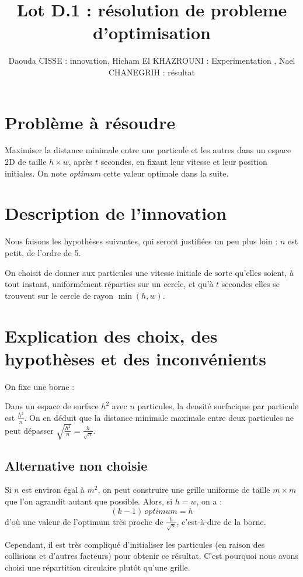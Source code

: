 \documentclass{article}
\begin{document}
\title{Lot D.1 : résolution de probleme d'optimisation}
\author{Daouda CISSE : innovation,
Hicham El KHAZROUNI : Experimentation ,
Nael CHANEGRIH : résultat}
\date{}
\maketitle

\section*{Problème à résoudre}
Maximiser la distance minimale entre une particule et les autres dans un espace 2D
de taille $h \times w$, après $t$ secondes, en fixant leur vitesse et leur position initiales.
On note \textit{optimum} cette valeur optimale dans la suite.

\section*{Description de l'innovation}
Nous faisons les hypothèses suivantes, qui seront justifiées un peu plus loin :
$n$ est petit, de l’ordre de 5.

On choisit de donner aux particules une vitesse initiale de sorte
qu’elles soient, à tout instant, uniformément réparties sur un cercle, et qu’à
$t$ secondes elles se trouvent sur le cercle de rayon $\min(h,w)$.

\section*{Explication des choix, des hypothèses et des inconvénients}
On fixe une borne :

Dans un espace de surface $h^2$ avec $n$ particules,
la densité surfacique par particule est $\frac{h^2}{n}$.
On en déduit que la distance minimale maximale
entre deux particules ne peut dépasser
$\sqrt{\frac{h^2}{n}} = \frac{h}{\sqrt{n}}$.

\subsection*{Alternative non choisie}
Si $n$ est environ égal à $m^2$, on peut construire une grille uniforme de taille $m \times m$
que l’on agrandit autant que possible. Alors, si $h = w$, on a :
\[
(k - 1)\,\textit{optimum} = h
\]
d’où une valeur de l’optimum très proche de $\frac{h}{\sqrt{n}}$, c’est-à-dire de la borne.

Cependant, il est très compliqué d’initialiser les particules (en raison des collisions et d’autres facteurs)
pour obtenir ce résultat. C’est pourquoi nous avons choisi une répartition circulaire plutôt qu’une grille.
\end{document}
